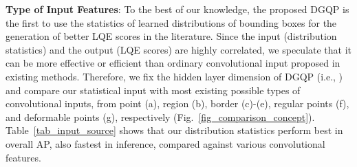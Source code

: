 \documentclass[10pt,twocolumn,letterpaper]{article}
\begin{document}
\begin{table}[t]
\small
	\centering
	\renewcommand\arraystretch{1.1}
	\newcommand{\tabincell}[2]{\begin{tabular}{@{}#1@{}}#2\end{tabular}}
	
	\vspace{-8pt}
	\caption{Performances of various  in DGQP.  denotes the baseline version without the usage of DGQP (i.e., GFLV1).}
	\vspace{-6pt}
	\label{tab_kp}
\end{table}





\noindent \textbf{Type of Input Features}: To the best of our knowledge, the proposed DGQP is the first to use the statistics of learned distributions of bounding boxes for the generation of better LQE scores in the literature. Since the input (distribution statistics) and the output (LQE scores) are highly correlated, we speculate that it can be more effective or efficient than ordinary convolutional input proposed in existing methods. Therefore, we fix the hidden layer dimension of DGQP (i.e., ) and compare our statistical input with most existing possible types of convolutional inputs, from point (a), region (b), border (c)-(e), regular points (f), and deformable points (g), respectively (Fig.~\ref{fig_comparison_concept}). Table~\ref{tab_input_source} shows that our distribution statistics perform best in overall AP, also fastest in inference, compared against various convolutional features.
\end{document}
